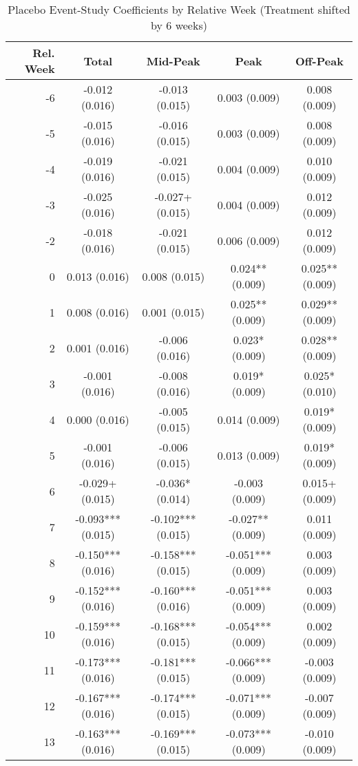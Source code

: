 \begin{table}[H]
\centering
\caption{Placebo Event-Study Coefficients by Relative Week (Treatment shifted by 6 weeks)}\label{tab:eventstudy_placebo}
\begin{tabular*}{\textwidth}{@{\extracolsep{\fill}}rcccc}
\toprule
Rel. Week & Total & Mid-Peak & Peak & Off-Peak
\\
\midrule
-6 & -0.012 (0.016) & -0.013 (0.015) & 0.003 (0.009) & 0.008 (0.009) \\
-5 & -0.015 (0.016) & -0.016 (0.015) & 0.003 (0.009) & 0.008 (0.009) \\
-4 & -0.019 (0.016) & -0.021 (0.015) & 0.004 (0.009) & 0.010 (0.009) \\
-3 & -0.025 (0.016) & -0.027+ (0.015) & 0.004 (0.009) & 0.012 (0.009) \\
-2 & -0.018 (0.016) & -0.021 (0.015) & 0.006 (0.009) & 0.012 (0.009) \\
 0 & 0.013 (0.016) & 0.008 (0.015) & 0.024** (0.009) & 0.025** (0.009) \\
 1 & 0.008 (0.016) & 0.001 (0.015) & 0.025** (0.009) & 0.029** (0.009) \\
 2 & 0.001 (0.016) & -0.006 (0.016) & 0.023* (0.009) & 0.028** (0.009) \\
 3 & -0.001 (0.016) & -0.008 (0.016) & 0.019* (0.009) & 0.025* (0.010) \\
 4 & 0.000 (0.016) & -0.005 (0.015) & 0.014 (0.009) & 0.019* (0.009) \\
 5 & -0.001 (0.016) & -0.006 (0.015) & 0.013 (0.009) & 0.019* (0.009) \\
 6 & -0.029+ (0.015) & -0.036* (0.014) & -0.003 (0.009) & 0.015+ (0.009) \\
 7 & -0.093*** (0.015) & -0.102*** (0.015) & -0.027** (0.009) & 0.011 (0.009) \\
 8 & -0.150*** (0.016) & -0.158*** (0.015) & -0.051*** (0.009) & 0.003 (0.009) \\
 9 & -0.152*** (0.016) & -0.160*** (0.016) & -0.051*** (0.009) & 0.003 (0.009) \\
10 & -0.159*** (0.016) & -0.168*** (0.015) & -0.054*** (0.009) & 0.002 (0.009) \\
11 & -0.173*** (0.016) & -0.181*** (0.015) & -0.066*** (0.009) & -0.003 (0.009) \\
12 & -0.167*** (0.016) & -0.174*** (0.015) & -0.071*** (0.009) & -0.007 (0.009) \\
13 & -0.163*** (0.016) & -0.169*** (0.015) & -0.073*** (0.009) & -0.010 (0.009) \\

\end{tabular*}
\end{table}

